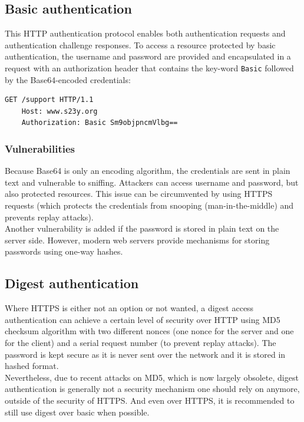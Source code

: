 \documentclass[a4paper, oneside, 11pt]{book}
\begin{document}
\subsection{Basic authentication}
This HTTP authentication protocol enables both authentication requests and authentication challenge responses. To access a resource protected by basic authentication, the username and password are provided and encapsulated in a request with an authorization header that contains the key-word \texttt{Basic} followed by the Base64-encoded credentials:

\begin{lstlisting}[breaklines]
	GET /support HTTP/1.1
	Host: www.s23y.org
	Authorization: Basic Sm9objpncmVlbg==
\end{lstlisting}

\subsubsection{Vulnerabilities}
Because Base64 is only an encoding algorithm, the credentials are sent in plain text and vulnerable to sniffing. Attackers can access username and password, but also protected resources. This issue can be circumvented by using HTTPS requests (which protects the credentials from snooping (man-in-the-middle) and prevents replay attacks).\\

Another vulnerability is added if the password is stored in plain text on the server side. However, modern web servers provide mechanisms for storing passwords using one-way hashes.

\subsection{Digest authentication}
Where HTTPS is either not an option or not wanted, a digest access authentication can achieve a certain level of security over HTTP using MD5 checksum algorithm with two different nonces (one nonce for the server and one for the client) and a serial request number (to prevent replay attacks). The password is kept secure as it is never sent over the network and it is stored in hashed format.\\

Nevertheless, due to recent attacks on MD5, which is now largely obsolete, digest authentication is generally not a security mechanism one should rely on anymore, outside of the security of HTTPS. And even over HTTPS, it is recommended to still use digest over basic when possible.
\end{document}

